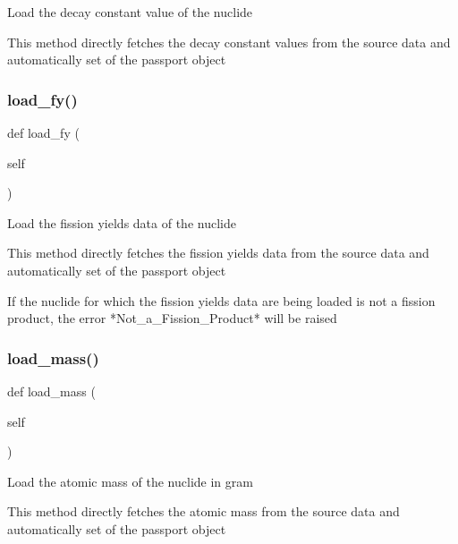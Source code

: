 \begin{DoxyVerb}Load the decay constant value of the nuclide

This method directly fetches the decay constant values from the source data and automatically set
of the passport object\end{DoxyVerb}
 \mbox{\label{classopenbu_1_1passport_1_1_passport_a3fd9b285c12428f2f1021f6fa498d27b}} 
\subsubsection{\texorpdfstring{load\+\_\+fy()}{load\_fy()}}
{\footnotesize\ttfamily def load\+\_\+fy (\begin{DoxyParamCaption}\item[{}]{self }\end{DoxyParamCaption})}

\begin{DoxyVerb}Load the fission yields data of the nuclide

This method directly fetches the fission yields data from the source data and automatically set
of the passport object

If the nuclide for which the fission yields data are being loaded is not a fission product,
the error *Not_a_Fission_Product* will be raised\end{DoxyVerb}
 \mbox{\label{classopenbu_1_1passport_1_1_passport_a791d705e172d19c0cdc181960287cc78}} 
\subsubsection{\texorpdfstring{load\+\_\+mass()}{load\_mass()}}
{\footnotesize\ttfamily def load\+\_\+mass (\begin{DoxyParamCaption}\item[{}]{self }\end{DoxyParamCaption})}

\begin{DoxyVerb}Load the atomic mass of the nuclide in gram

This method directly fetches the atomic mass from the source data and automatically set
of the passport object\end{DoxyVerb}
 \mbox{\label{classopenbu_1_1passport_1_1_passport_a1687aea883b9cdececdb7b88b659cd5c}} 
